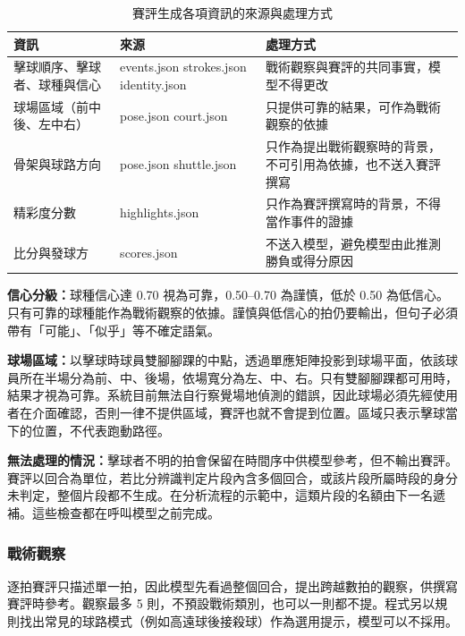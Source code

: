 \begin{table}[htbp]
  \centering
  \small
  \caption{賽評生成各項資訊的來源與處理方式}
  \label{tab:commentary-facts}
  \begin{tabularx}{\linewidth}{|>{\raggedright\arraybackslash}p{9.5em}|>{\raggedright\arraybackslash\ttfamily\footnotesize}p{8em}|L|}
    \hline
    資訊 & \normalfont 來源 & 處理方式 \\ \hline
    擊球順序、擊球者、球種與信心 & events.json strokes.json identity.json & 戰術觀察與賽評的共同事實，模型不得更改 \\ \hline
    球場區域（前中後、左中右） & pose.json court.json & 只提供可靠的結果，可作為戰術觀察的依據 \\ \hline
    骨架與球路方向 & pose.json shuttle.json & 只作為提出戰術觀察時的背景，不可引用為依據，也不送入賽評撰寫 \\ \hline
    精彩度分數 & highlights.json & 只作為賽評撰寫時的背景，不得當作事件的證據 \\ \hline
    比分與發球方 & scores.json & 不送入模型，避免模型由此推測勝負或得分原因 \\ \hline
  \end{tabularx}
\end{table}

\textbf{信心分級：}球種信心達 0.70 視為可靠，0.50--0.70 為謹慎，低於 0.50 為低信心。只有可靠的球種能作為戰術觀察的依據。謹慎與低信心的拍仍要輸出，但句子必須帶有「可能」、「似乎」等不確定語氣。

\textbf{球場區域：}以擊球時球員雙腳腳踝的中點，透過單應矩陣投影到球場平面，依該球員所在半場分為前、中、後場，依場寬分為左、中、右。只有雙腳腳踝都可用時，結果才視為可靠。系統目前無法自行察覺場地偵測的錯誤，因此球場必須先經使用者在介面確認，否則一律不提供區域，賽評也就不會提到位置。區域只表示擊球當下的位置，不代表跑動路徑。

\textbf{無法處理的情況：}擊球者不明的拍會保留在時間序中供模型參考，但不輸出賽評。賽評以回合為單位，若比分辨識判定片段內含多個回合，或該片段所屬時段的身分未判定，整個片段都不生成。在分析流程的示範中，這類片段的名額由下一名遞補。這些檢查都在呼叫模型之前完成。

\subsubsection{戰術觀察}

逐拍賽評只描述單一拍，因此模型先看過整個回合，提出跨越數拍的觀察，供撰寫賽評時參考。觀察最多 5 則，不預設戰術類別，也可以一則都不提。程式另以規則找出常見的球路模式（例如高遠球後接殺球）作為選用提示，模型可以不採用。


